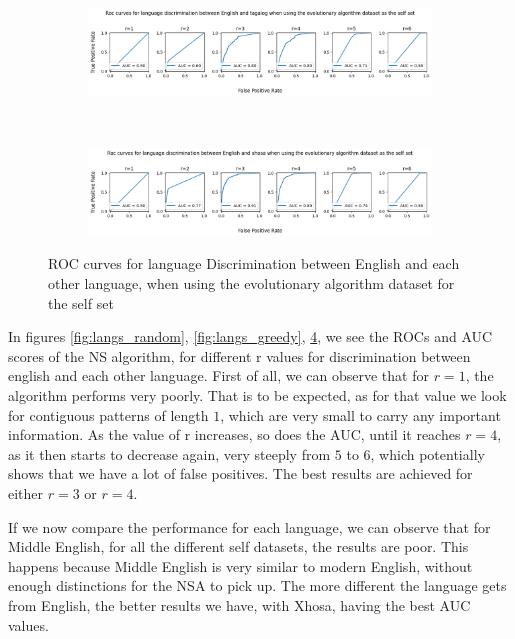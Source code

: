 \documentclass{article}
\begin{document}
\begin{figure}[ht]
\begin{subfigure}[t]{\linewidth}
        \label{fig:eng_mid_pla_ea}
    \end{subfigure}
    \\
    \begin{subfigure}[t]{\linewidth}
        \centering
        \includegraphics[width=\linewidth]{images/english_tagalog_ea.png}
        \label{fig:eng_mid_tag_ea}
    \end{subfigure}
        \\
    \begin{subfigure}[t]{\linewidth}
        \centering
        \includegraphics[width=\linewidth]{images/english_xhosa_ea.png}
        \label{fig:eng_xho_ea}
    \end{subfigure}
    
    \caption{ROC curves for language Discrimination between English and each other language, when using the evolutionary algorithm dataset for the self set}
    \label{fig:langs_ea}
\end{figure}


In figures \ref{fig:langs_random}, \ref{fig:langs_greedy}, \ref{fig:langs_ea}, we see the ROCs and AUC scores of the NS 
algorithm, for different r values for discrimination between english and each other language. First of all, we can 
observe that for $r=1$, the algorithm performs very poorly. That is to be expected, as for that value we look for 
contiguous patterns of length $1$, which are very small to carry any important information. As the value of r increases, 
so does the AUC, until it reaches $r=4$, as it then starts to decrease again, very steeply from $5$ to $6$, which 
potentially shows that we have a lot of false positives. The best results are achieved for either $r=3$ or $r=4$.

If we now compare the performance for each language, we can observe that for Middle English, for all the different self 
datasets, the results are poor. This happens because Middle English is very similar to modern English, without enough 
distinctions for the NSA to pick up. The more different the language gets from English, the better results we have, 
with Xhosa, having the best AUC values.
\end{document}
